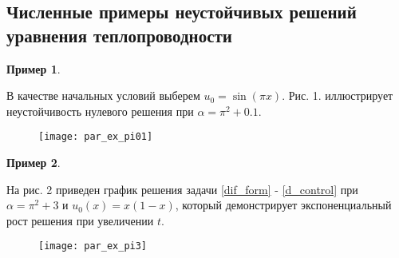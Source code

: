 \subsection{Численные примеры неустойчивых решений уравнения теплопроводности}
\vspace{1em}

\newtheorem{exmp}{Пример}

\begin{exmp}
\end{exmp}

В качестве начальных условий выберем $u_0 = \sin(\pi x)$. Рис. 1. иллюстрирует 
неустойчивость нулевого решения при $\alpha = \pi^2 + 0.1$.

\begin{figure}[H]
    \centering
        \texttt{[image: par\_ex\_pi01]}
        \caption{}
        \label{fig:test1}
\end{figure}

\begin{exmp}
\end{exmp}

На рис. 2 приведен график решения задачи \eqref{dif_form} - \eqref{d_control}
при $\alpha = \pi^2 + 3$ и $u_0(x) = x(1 - x)$, который демонстрирует 
экспоненциальный рост решения при увеличении $t$.

\begin{figure}[H]
    \centering
        \texttt{[image: par\_ex\_pi3]}
        \caption{}
        \label{fig:test1}
\end{figure}

